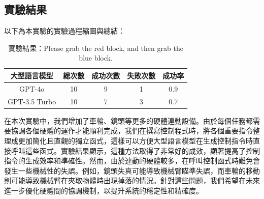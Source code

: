 \documentclass[class=NCU_thesis, crop=false]{standalone}
\begin{document}
\subsection{實驗結果}
以下為本實驗的實驗過程縮圖與總結：\\


\begin{table}[h]
    \centering
    \caption{實驗結果：Please grab the red block, and then grab the blue block.}
    \begin{tabular}{ccccc}
    \hline
    大型語言模型 & 總次數 & 成功次數 & 失敗次數 & 成功率 \\
    \hline
    GPT-4o & 10 & 9 & 1 & 0.9\\
    \hline
    GPT-3.5 Turbo & 10 & 7 & 3 & 0.7\\
    \hline
    \end{tabular}
\end{table}
在本次實驗中，我們增加了車輪、鏡頭等更多的硬體連動設備。由於每個任務都需要協調各個硬體的運作才能順利完成，我們在撰寫控制程式時，將各個重要指令整理成更加簡化且直觀的獨立函式，這樣可以方便大型語言模型在生成控制指令時直接呼叫這些函式。實驗結果顯示，這種方法取得了非常好的成效，顯著提高了控制指令的生成效率和準確性。然而，由於連動的硬體較多，在呼叫控制函式時難免會發生一些機械性的失誤。例如，鏡頭失真可能導致機械臂瞄準失誤，而車輪的移動則可能導致機械臂在夾取物體時出現掉落的情況。針對這些問題，我們希望在未來進一步優化硬體間的協調機制，以提升系統的穩定性和精確度。
\end{document}
